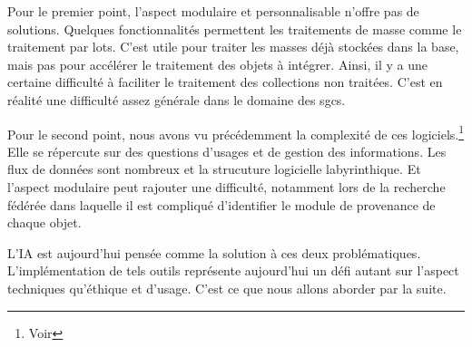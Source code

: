 Pour le premier point, l'aspect modulaire et personnalisable n'offre pas de solutions. Quelques fonctionnalités permettent les traitements de masse comme le traitement par lots. C'est utile pour traiter les masses déjà stockées dans la base, mais pas pour accélérer le traitement des objets à intégrer. Ainsi, il y a une certaine difficulté à faciliter le traitement des collections non traitées. C'est en réalité une difficulté assez générale dans le domaine des \glspl{sgc}. 

Pour le second point, nous avons vu précédemment la complexité de ces logiciels.\footnote{Voir } Elle se répercute sur des questions d'usages et de gestion des informations. Les flux de données sont nombreux et la strucuture logicielle labyrinthique. Et l'aspect modulaire peut rajouter une difficulté, notamment lors de la recherche fédérée dans laquelle il est compliqué d'identifier le module de provenance de chaque objet.\newline

L'\gls{IA} est aujourd'hui pensée comme la solution à ces deux problématiques. L'implémentation de tels outils représente aujourd'hui un défi autant sur l'aspect techniques qu'éthique et d'usage. C'est ce que nous allons aborder par la suite.
